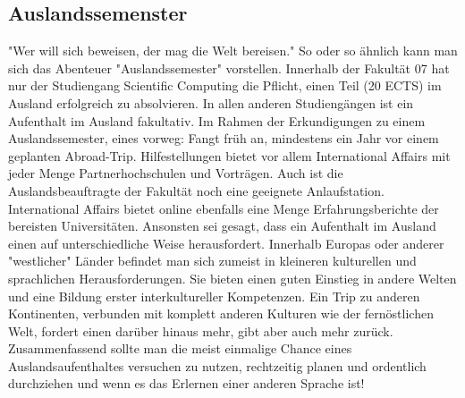 \subsection{Auslandssemenster}
"Wer will sich beweisen, der mag die Welt bereisen."\doublebreak
So oder so ähnlich kann man sich das Abenteuer "Auslandssemester" 
vorstellen. Innerhalb der Fakultät 07 hat nur der Studiengang Scientific 
Computing die Pflicht, einen Teil (20 ECTS) im Ausland erfolgreich zu 
absolvieren. In allen anderen Studiengängen ist ein Aufenthalt im 
Ausland fakultativ. \doublebreak
Im Rahmen der Erkundigungen zu einem Auslandssemester, eines
vorweg: Fangt früh an, mindestens ein Jahr vor einem geplanten
Abroad-Trip. Hilfestellungen bietet vor allem International Affairs
mit jeder Menge Partnerhochschulen und Vorträgen. Auch ist die Auslandsbeauftragte der Fakultät noch eine geeignete
Anlaufstation. International Affairs bietet online ebenfalls eine Menge Erfahrungsberichte der bereisten Universitäten.\doublebreak
Ansonsten sei gesagt, dass ein Aufenthalt im Ausland einen auf 
unterschiedliche Weise herausfordert. Innerhalb Europas oder anderer 
"westlicher" Länder befindet man sich zumeist in kleineren kulturellen
und sprachlichen Herausforderungen. \doublebreak
Sie bieten einen guten Einstieg in andere Welten und eine Bildung 
erster interkultureller Kompetenzen. Ein Trip zu anderen Kontinenten,
verbunden mit komplett anderen Kulturen wie der fernöstlichen Welt, 
fordert einen darüber hinaus mehr, gibt aber auch mehr zurück.\doublebreak 
Zusammenfassend sollte man die meist einmalige Chance eines 
Auslandsaufenthaltes versuchen zu nutzen, rechtzeitig planen und 
ordentlich durchziehen und wenn es das Erlernen einer anderen 
Sprache ist! 